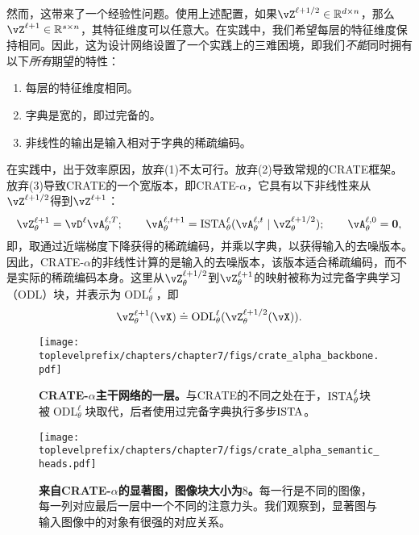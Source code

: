 \documentclass[../../book-main_zh.tex]{subfiles}
\begin{document}
然而，这带来了一个经验性问题。使用上述配置，如果\(\vZ^{\ell + 1/2} \in \R^{d \times n}\)，那么\(\vZ^{\ell + 1} \in \R^{s \times n}\)，其特征维度可以任意大。在实践中，我们希望每层的特征维度保持相同。因此，这为设计网络设置了一个实践上的三难困境，即我们\textit{不能}同时拥有以下\textit{所有}期望的特性：
\begin{enumerate}
    \item 每层的特征维度相同。
    \item 字典是宽的，即过完备的。
    \item 非线性的输出是输入相对于字典的稀疏编码。
\end{enumerate}
在实践中，出于效率原因，放弃(1)不太可行。放弃(2)导致常规的CRATE框架。放弃(3)导致CRATE的一个宽版本，即CRATE-\(\alpha\)，它具有以下非线性来从\(\vZ^{\ell + 1/2}\)得到\(\vZ^{\ell + 1}\)：
\begin{equation}
    \vZ_{\theta}^{\ell + 1} = \vD^{\ell}\vA_{\theta}^{\ell, T}; \qquad \vA_{\theta}^{\ell, t + 1} = \ISTA_{\theta}^{\ell}(\vA_{\theta}^{\ell, t} \mid \vZ_{\theta}^{\ell + 1/2}); \qquad \vA_{\theta}^{\ell, 0} = \vzero,
\end{equation}
即，取通过近端梯度下降获得的稀疏编码，并乘以字典，以获得输入的去噪版本。因此，CRATE-\(\alpha\)的非线性计算的是输入的去噪版本，该版本适合稀疏编码，而不是实际的稀疏编码本身。这里从\(\vZ_{\theta}^{\ell + 1/2}\)到\(\vZ_{\theta}^{\ell + 1}\)的映射被称为过完备字典学习（ODL）块，并表示为\(\operatorname{ODL}_{\theta}^{\ell}\)，即
\begin{equation}
    \vZ_{\theta}^{\ell + 1}(\vX) \doteq \operatorname{ODL}_{\theta}^{\ell}(\vZ_{\theta}^{\ell + 1/2}(\vX)).
\end{equation}

\begin{figure}
    \centering 
    \texttt{[image: \\toplevelprefix/chapters/chapter7/figs/crate\_alpha\_backbone.pdf]}
    \caption{\small\textbf{CRATE-\(\alpha\)主干网络的一层。}与CRATE的不同之处在于，\(\operatorname{ISTA}_{\theta}^{\ell}\)块被\(\operatorname{ODL}_{\theta}^{\ell}\)块取代，后者使用过完备字典执行多步\(\operatorname{ISTA}\)。}
    \label{fig:crate_alpha_backbone}
\end{figure}

\begin{figure}
    \centering 
    \texttt{[image: \\toplevelprefix/chapters/chapter7/figs/crate\_alpha\_semantic\_heads.pdf]}
    \caption{\small\textbf{来自CRATE-\(\alpha\)的显著图，图像块大小为\(8\)。}每一行是不同的图像，每一列对应最后一层中一个不同的注意力头。我们观察到，显著图与输入图像中的对象有很强的对应关系。}
    \label{fig:crate_alpha_saliency_maps}
\end{figure}
\end{document}
